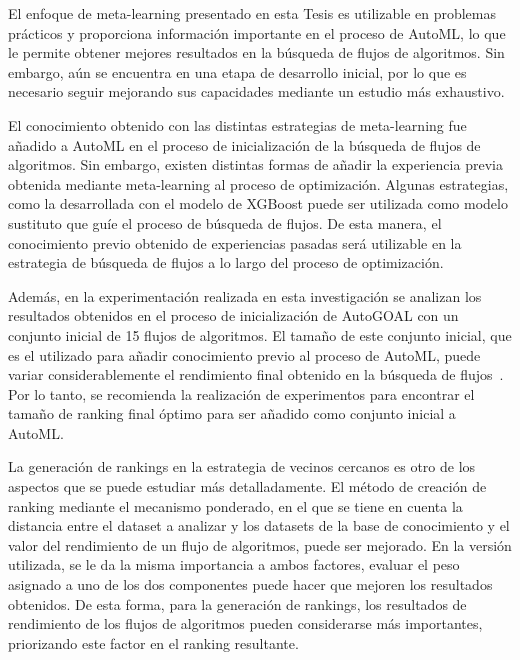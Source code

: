 \begin{recomendations}\label{recomendations}

El enfoque de meta-learning presentado en esta Tesis es utilizable en problemas prácticos y proporciona información importante en el proceso de AutoML, lo que le permite obtener mejores resultados en la búsqueda de flujos de algoritmos. Sin embargo, aún se encuentra en una etapa de desarrollo inicial, por lo que es necesario seguir mejorando sus capacidades mediante un estudio más exhaustivo.

El conocimiento obtenido con las distintas estrategias de meta-learning fue añadido a AutoML en el proceso de inicialización de la búsqueda de flujos de algoritmos. Sin embargo, existen distintas formas de añadir la experiencia previa obtenida mediante meta-learning al proceso de optimización. Algunas estrategias, como la desarrollada con el modelo de XGBoost puede ser utilizada como modelo sustituto que guíe el proceso de búsqueda de flujos. De esta manera, el conocimiento previo obtenido de experiencias pasadas será utilizable en la estrategia de búsqueda de flujos a lo largo del proceso de optimización.

Además, en la experimentación realizada en esta investigación se analizan los resultados obtenidos en el proceso de inicialización de AutoGOAL con un conjunto inicial de 15 flujos de algoritmos. El tamaño de este conjunto inicial, que es el utilizado para añadir conocimiento previo al proceso de AutoML, puede variar considerablemente el rendimiento final obtenido en la búsqueda de flujos~\cite{rankml}. Por lo tanto, se recomienda la realización de experimentos para encontrar el tamaño de ranking final óptimo para ser añadido como conjunto inicial a AutoML.

La generación de rankings en la estrategia de vecinos cercanos es otro de los aspectos que se puede estudiar más detalladamente. El método de creación de ranking mediante el mecanismo ponderado, en el que se tiene en cuenta la distancia entre el dataset a analizar y los datasets de la base de conocimiento y el valor del rendimiento de un flujo de algoritmos, puede ser mejorado. En la versión utilizada, se le da la misma importancia a ambos factores, evaluar el peso asignado a uno de los dos componentes puede hacer que mejoren los resultados obtenidos. De esta forma, para la generación de rankings, los resultados de rendimiento de los flujos de algoritmos pueden considerarse más importantes, priorizando este factor en el ranking resultante.


\end{recomendations}
